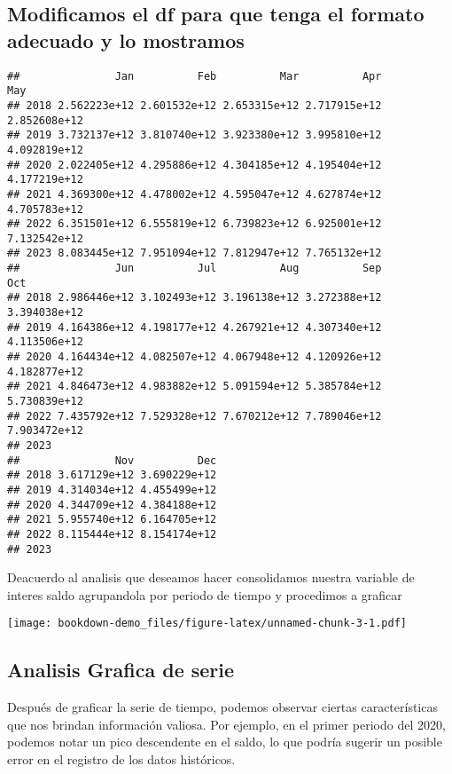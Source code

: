 \documentclass[
]{book}
\begin{document}
\hypertarget{modificamos-el-df-para-que-tenga-el-formato-adecuado-y-lo-mostramos}{%
\subsection{Modificamos el df para que tenga el formato adecuado y lo mostramos}\label{modificamos-el-df-para-que-tenga-el-formato-adecuado-y-lo-mostramos}}

\begin{verbatim}
##               Jan          Feb          Mar          Apr          May
## 2018 2.562223e+12 2.601532e+12 2.653315e+12 2.717915e+12 2.852608e+12
## 2019 3.732137e+12 3.810740e+12 3.923380e+12 3.995810e+12 4.092819e+12
## 2020 2.022405e+12 4.295886e+12 4.304185e+12 4.195404e+12 4.177219e+12
## 2021 4.369300e+12 4.478002e+12 4.595047e+12 4.627874e+12 4.705783e+12
## 2022 6.351501e+12 6.555819e+12 6.739823e+12 6.925001e+12 7.132542e+12
## 2023 8.083445e+12 7.951094e+12 7.812947e+12 7.765132e+12             
##               Jun          Jul          Aug          Sep          Oct
## 2018 2.986446e+12 3.102493e+12 3.196138e+12 3.272388e+12 3.394038e+12
## 2019 4.164386e+12 4.198177e+12 4.267921e+12 4.307340e+12 4.113506e+12
## 2020 4.164434e+12 4.082507e+12 4.067948e+12 4.120926e+12 4.182877e+12
## 2021 4.846473e+12 4.983882e+12 5.091594e+12 5.385784e+12 5.730839e+12
## 2022 7.435792e+12 7.529328e+12 7.670212e+12 7.789046e+12 7.903472e+12
## 2023                                                                 
##               Nov          Dec
## 2018 3.617129e+12 3.690229e+12
## 2019 4.314034e+12 4.455499e+12
## 2020 4.344709e+12 4.384188e+12
## 2021 5.955740e+12 6.164705e+12
## 2022 8.115444e+12 8.154174e+12
## 2023
\end{verbatim}

Deacuerdo al analisis que deseamos hacer consolidamos nuestra variable de interes saldo agrupandola por periodo de tiempo y procedimos a graficar

\texttt{[image: bookdown-demo\_files/figure-latex/unnamed-chunk-3-1.pdf]}

\hypertarget{analisis-grafica-de-serie}{%
\subsection{Analisis Grafica de serie}\label{analisis-grafica-de-serie}}

Después de graficar la serie de tiempo, podemos observar ciertas características que nos brindan información valiosa. Por ejemplo, en el primer periodo del 2020, podemos notar un pico descendente en el saldo, lo que podría sugerir un posible error en el registro de los datos históricos.
\end{document}
